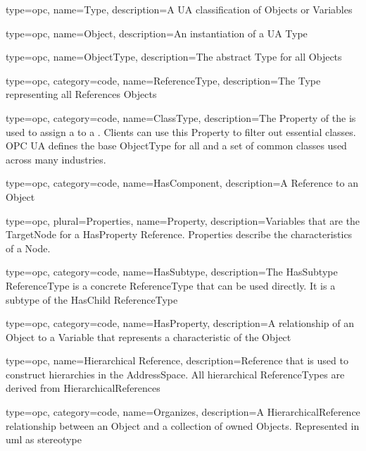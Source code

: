 {
  type=opc,
  name=Type,
  description={A UA classification of \glspl{Object} or \glspl{Variable}}
}

{
  type=opc,
  name=Object,
  description={An instantiation of a UA \gls{Type}}
}

{
  type=opc,
  name=ObjectType,
  description={The abstract \gls{Type} for all \glspl{Object}}
}

{
  type=opc,
  category=code,
  name=ReferenceType,
  description={The \gls{Type} representing all \glspl{Reference} \glspl{Object}}
}

{
  type=opc,
  category=code,
  name=ClassType,
  description={The  \gls{Property} of the  is used to assign a  to a . Clients can use this Property to filter out essential classes. OPC UA defines the base \gls{ObjectType} for all  and a set of common classes used across many industries.}
}

{
  type=opc,
  category=code,
  name=HasComponent,
  description={A \gls{Reference} to an \gls{Object}}
}

{
  type=opc,
  plural=Properties,
  name=Property,
  description={Variables that are the TargetNode for a \gls{HasProperty} Reference. Properties describe the characteristics of a Node.}
}

{
  type=opc,
  category=code,
  name=HasSubtype,
  description={The HasSubtype ReferenceType is a concrete ReferenceType that can be used directly. It is a subtype of the HasChild ReferenceType}
}

{
  type=opc,
  category=code,
  name=HasProperty,
  description={A relationship of an \gls{Object} to a \gls{Variable} that represents a characteristic of the \gls{Object}}
}

{
  type=opc,
  name={Hierarchical Reference},
  description={Reference that is used to construct hierarchies in the \gls{AddressSpace}. All hierarchical ReferenceTypes are derived from HierarchicalReferences}
}

{
  type=opc,
  category=code,
  name=Organizes,
  description={A \gls{HierarchicalReference} relationship between an \gls{Object} and a collection of owned \glspl{Object}. Represented in \gls{uml} as  \gls{stereotype}}
}

